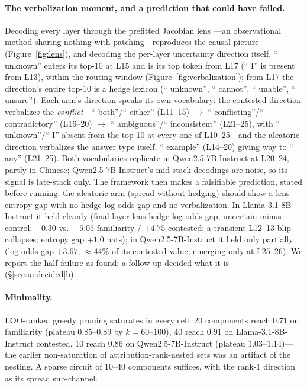 \documentclass{article}
\newcommand{\lm}{Llama-3.1-8B-Instruct}
\newcommand{\qw}{Qwen2.5-7B-Instruct}
\begin{document}
\paragraph{The verbalization moment, and a prediction that could have failed.}
Decoding every layer through the prefitted Jacobian lens \citep{anthropic2026workspace}---an observational
method sharing nothing with patching---reproduces the causal picture (Figure~\ref{fig:lens}), and decoding
the per-layer uncertainty direction itself, `` unknown'' enters its top-10 at L15 and is its top token
from L17 (`` I'' is present from L13), within the routing window (Figure~\ref{fig:verbalization}); from
L17 the direction's entire top-10 is a hedge lexicon (`` unknown'', `` cannot'', `` unable'',
`` unsure''). Each arm's direction speaks its own vocabulary: the contested direction verbalizes the
\emph{conflict}---`` both''/`` either'' (L11--15) $\to$ `` conflicting''/`` contradictory'' (L16--20)
$\to$ `` ambiguous''/`` inconsistent'' (L21--25), with `` unknown''/`` I'' absent from the top-10 at every
one of L10--25---and the
aleatoric direction verbalizes the answer type itself, `` example'' (L14--20) giving way to `` any''
(L21--25). Both vocabularies replicate in \qw{} at L20--24, partly in Chinese; \qw{}'s mid-stack
decodings are noise, so its signal is late-stack only. The framework then makes a
falsifiable prediction, stated before running: the aleatoric arm (spread without hedging) should show a
lens entropy gap with no hedge log-odds gap and no verbalization. In \lm{} it held cleanly (final-layer
lens hedge log-odds gap, uncertain minus control: $+0.30$ vs.\ $+5.05$ familiarity / $+4.75$ contested; a
transient L12--13 blip collapses; entropy gap $+1.0$ nats); in \qw{} it held only partially (log-odds gap
$+3.67$, ${\approx}44\%$ of its contested value, emerging only at L25--26). We report the half-failure as found; a follow-up decided what it is
(\S\ref{sec:undecided}b).

\paragraph{Minimality.}
LOO-ranked greedy pruning saturates in every cell: 20 components reach $0.71$ on familiarity (plateau
$0.85$--$0.89$ by $k{=}60$--$100$), 40 reach $0.91$ on \lm{} contested, 10 reach $0.86$ on \qw{} (plateau
$1.03$--$1.14$)---the earlier non-saturation of attribution-rank-nested sets was an artifact of the
nesting. A sparse circuit of 10--40 components suffices, with the rank-1 direction as its spread
sub-channel.
\end{document}

